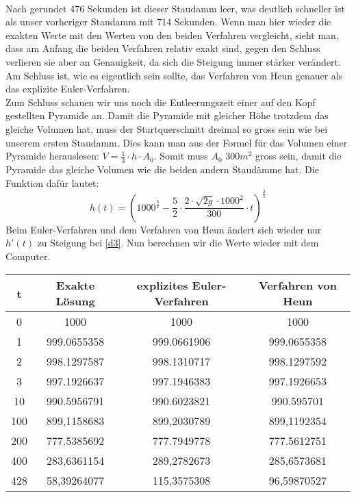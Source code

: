 \documentclass[a4paper,12pt]{report}
\begin{document}
\noindent
\\Nach gerundet 476 Sekunden ist dieser Staudamm leer, was deutlich schneller ist als unser vorheriger Staudamm mit 714 Sekunden. Wenn man hier wieder die exakten Werte mit den Werten von den beiden Verfahren vergleicht, sieht man, dass am Anfang die beiden Verfahren relativ exakt sind, gegen den Schluss verlieren sie aber an Genauigkeit, da sich die Steigung immer stärker verändert. Am Schluss ist, wie es eigentlich sein sollte, das Verfahren von Heun genauer als das explizite Euler-Verfahren. \\

\noindent
Zum Schluss schauen wir uns noch die Entleerungszeit einer auf den Kopf gestellten Pyramide an. Damit die Pyramide mit gleicher Höhe trotzdem das gleiche Volumen hat, muss der Startquerschnitt dreimal so gross sein wie bei unserem ersten Staudamm. Dies kann man aus der Formel für das Volumen einer Pyramide herauslesen: $V = \frac{1}{3} \cdot h \cdot A_0$. Somit muss $A_0$ $300 m^2$ gross sein, damit die Pyramide das gleiche Volumen wie die beiden andern Staudämme hat. Die Funktion dafür lautet:
\begin{equation}
h(t) = \left( 1000^{\frac{5}{2}}- \frac{5}{2} \cdot \frac{2 \cdot  \sqrt{2g} \cdot 1000^2}{300} \cdot t \right)^{\frac{2}{5}}
\end{equation} 
Beim Euler-Verfahren und dem Verfahren von Heun ändert sich wieder nur $h'(t)$ zu Steigung bei \ref{d3}. Nun berechnen wir die Werte wieder mit dem Computer. \\

\begin{center}
\begin{tabular}[h]{c|c|c|c}
t & Exakte Lösung & explizites Euler-Verfahren & Verfahren von Heun \\
\hline
0 & 1000 & 1000 & 1000 \\
\hline
1 &999.0655358 & 999.0661906& 999.0655358 \\
\hline
2 & 998.1297587 & 998.1310717 & 998.1297592\\
\hline
3 & 997.1926637 & 997.1946383 & 997.1926653 \\
\hline
10 & 990.5956791 &990.6023821 & 990.595701 \\
\hline
100 & 899,1158683 &899,2030789 & 899,1192354 \\
\hline
200 & 777.5385692 & 777.7949778 & 777.5612751 \\
\hline
400 & 283,6361154 & 289,2782673 & 285,6573681 \\
\hline
428& 58,39264077 & 115,3575308 & 96,59870527 \\

\end{tabular}\\
\end{center}
\end{document}
